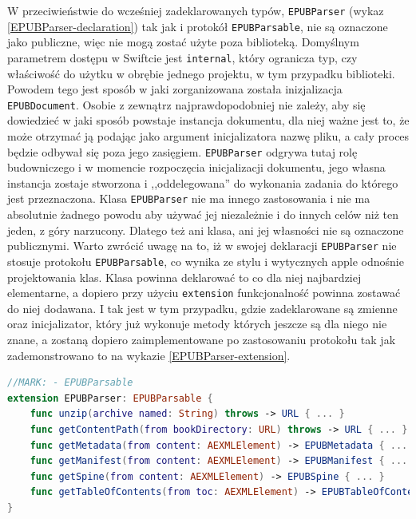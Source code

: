 W przeciwieństwie do wcześniej zadeklarowanych typów, \texttt{EPUBParser} (wykaz \ref{EPUBParser-declaration}) tak jak i protokół \texttt{EPUBParsable}, nie są oznaczone jako publiczne, więc nie mogą zostać użyte poza biblioteką. Domyślnym parametrem dostępu w Swiftcie jest \texttt{internal}, który ogranicza typ, czy właściwość do użytku w obrębie jednego projektu, w tym przypadku biblioteki. Powodem tego jest sposób w jaki zorganizowana została inizjalizacja \texttt{EPUBDocument}. Osobie z zewnątrz najprawdopodobniej nie zależy, aby się dowiedzieć w jaki sposób powstaje instancja dokumentu, dla niej ważne jest to, że może otrzymać ją podając jako argument inicjalizatora nazwę pliku, a cały proces będzie odbywał się poza jego zasięgiem. \texttt{EPUBParser} odgrywa tutaj rolę budowniczego i w momencie rozpoczęcia inicjalizacji dokumentu, jego własna instancja zostaje stworzona i ,,oddelegowana'' do wykonania zadania do którego jest przeznaczona. Klasa \texttt{EPUBParser} nie ma innego zastosowania  i nie ma absolutnie żadnego powodu aby używać jej niezależnie i do innych celów niż ten jeden, z góry narzucony. Dlatego też ani klasa, ani jej własności nie są oznaczone publicznymi. Warto zwrócić uwagę na to, iż w swojej deklaracji \texttt{EPUBParser} nie stosuje protokołu \texttt{EPUBParsable}, co wynika ze stylu i wytycznych apple odnośnie projektowania klas. Klasa powinna deklarować to co dla niej najbardziej elementarne, a dopiero przy użyciu \texttt{extension} funkcjonalność powinna zostawać do niej dodawana. I tak jest w tym przypadku, gdzie zadeklarowane są zmienne oraz inicjalizator, który już wykonuje metody których jeszcze są dla niego nie znane, a zostaną dopiero zaimplementowane po zastosowaniu protokołu tak jak zademonstrowano to na wykazie \ref{EPUBParser-extension}.

\begin{lstlisting}[firstnumber=30,caption={Klasa EPUBParser stosuje protokół EPUBParsable}, language=swift,label=EPUBParser-extension]
//MARK: - EPUBParsable
extension EPUBParser: EPUBParsable {
    func unzip(archive named: String) throws -> URL { ... }
    func getContentPath(from bookDirectory: URL) throws -> URL { ... }
    func getMetadata(from content: AEXMLElement) -> EPUBMetadata { ... }
    func getManifest(from content: AEXMLElement) -> EPUBManifest { ... }
    func getSpine(from content: AEXMLElement) -> EPUBSpine { ... }
    func getTableOfContents(from toc: AEXMLElement) -> EPUBTableOfContents { ... }
}
\end{lstlisting}

